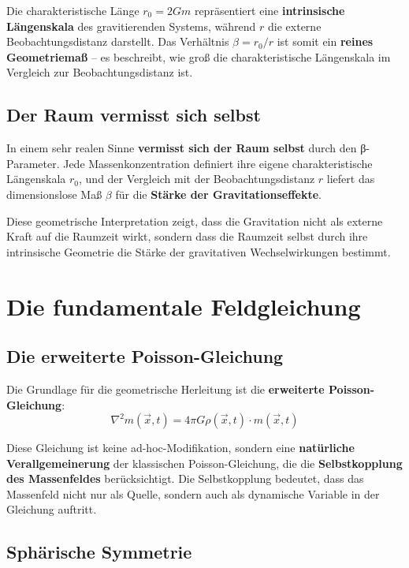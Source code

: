\documentclass[12pt,a4paper]{report}
\begin{document}
	Die charakteristische Länge $r_0 = 2Gm$ repräsentiert eine \textbf{intrinsische Längenskala} des gravitierenden Systems, während $r$ die externe Beobachtungsdistanz darstellt. Das Verhältnis $\beta = r_0/r$ ist somit ein \textbf{reines Geometriemaß} -- es beschreibt, wie groß die charakteristische Längenskala im Vergleich zur Beobachtungsdistanz ist.
	
	\subsection{Der Raum vermisst sich selbst}
	
	In einem sehr realen Sinne \textbf{vermisst sich der Raum selbst} durch den β-Parameter. Jede Massenkonzentration definiert ihre eigene charakteristische Längenskala $r_0$, und der Vergleich mit der Beobachtungsdistanz $r$ liefert das dimensionslose Maß $\beta$ für die \textbf{Stärke der Gravitationseffekte}.
	
	Diese geometrische Interpretation zeigt, dass die Gravitation nicht als externe Kraft auf die Raumzeit wirkt, sondern dass die Raumzeit selbst durch ihre intrinsische Geometrie die Stärke der gravitativen Wechselwirkungen bestimmt.
	
	\section{Die fundamentale Feldgleichung}
	
	\subsection{Die erweiterte Poisson-Gleichung}
	
	Die Grundlage für die geometrische Herleitung ist die \textbf{erweiterte Poisson-Gleichung}:
	\begin{equation}
		\nabla^2 m(\vec{x},t) = 4\pi G \rho(\vec{x},t) \cdot m(\vec{x},t)
	\end{equation}
	
	Diese Gleichung ist keine ad-hoc-Modifikation, sondern eine \textbf{natürliche Verallgemeinerung} der klassischen Poisson-Gleichung, die die \textbf{Selbstkopplung des Massenfeldes} berücksichtigt. Die Selbstkopplung bedeutet, dass das Massenfeld nicht nur als Quelle, sondern auch als dynamische Variable in der Gleichung auftritt.
	
	\subsection{Sphärische Symmetrie}
	
\end{document}
